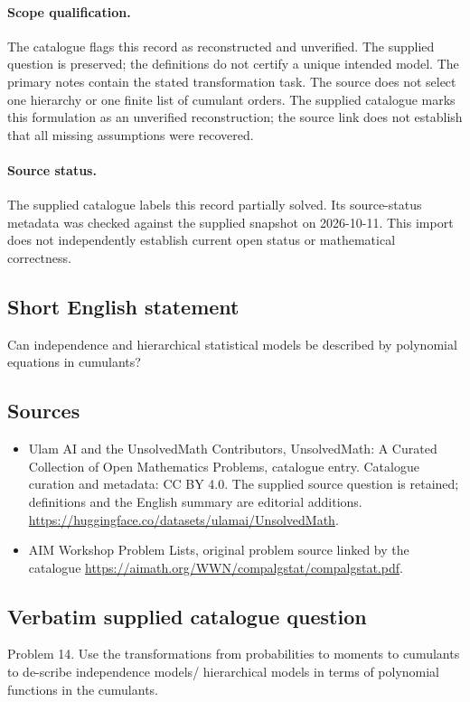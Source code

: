 \documentclass[11pt]{article}
\begin{document}
\paragraph{Scope qualification.}
The catalogue flags this record as reconstructed and unverified. The supplied question is preserved; the definitions do not certify a unique intended model. The primary notes contain the stated transformation task. The source does not select one hierarchy or one finite list of cumulant orders.
The supplied catalogue marks this formulation as an unverified reconstruction; the source link does not establish that all missing assumptions were recovered.
\paragraph{Source status.}
The supplied catalogue labels this record partially solved. Its source-status metadata was checked against the supplied snapshot on 2026-10-11. This import does not independently establish current open status or mathematical correctness.
\subsection{Short English statement}
Can independence and hierarchical statistical models be described by polynomial equations in cumulants?
\subsection{Sources}
\begin{itemize}
\item[S1] Ulam AI and the UnsolvedMath Contributors, UnsolvedMath: A Curated Collection of Open Mathematics Problems, catalogue entry. Catalogue curation and metadata: CC BY 4.0. The supplied source question is retained; definitions and the English summary are editorial additions.
\url{https://huggingface.co/datasets/ulamai/UnsolvedMath}.
\item[S2] AIM Workshop Problem Lists, original problem source linked by the catalogue
\url{https://aimath.org/WWN/compalgstat/compalgstat.pdf}.
\end{itemize}
\subsection{Verbatim supplied catalogue question}
Problem 14. Use the transformations from probabilities to moments to cumulants to de-scribe independence models/ hierarchical models in terms of polynomial functions in the cumulants.
\end{document}

